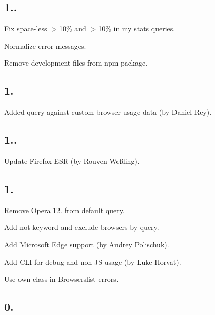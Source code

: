 \subsection*{1..}


\begin{DoxyItemize}
\item Fix space-\/less {\ttfamily $>$10\%} and {\ttfamily $>$10\% in my stats} queries.
\item Normalize error messages.
\item Remove development files from npm package.
\end{DoxyItemize}

\subsection*{1.}


\begin{DoxyItemize}
\item Added query against custom browser usage data (by Daniel Rey).
\end{DoxyItemize}

\subsection*{1..}


\begin{DoxyItemize}
\item Update Firefox E\+SR (by Rouven Weßling).
\end{DoxyItemize}

\subsection*{1.}


\begin{DoxyItemize}
\item Remove Opera 12. from default query.
\item Add {\ttfamily not} keyword and exclude browsers by query.
\item Add Microsoft Edge support (by Andrey Polischuk).
\item Add C\+LI for debug and non-\/\+JS usage (by Luke Horvat).
\item Use own class in Browserslist errors.
\end{DoxyItemize}

\subsection*{0.}



